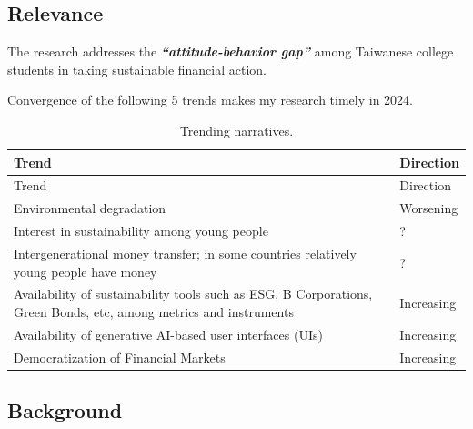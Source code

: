 \documentclass[
  letterpaper,
  DIV=11,
  numbers=noendperiod]{scrartcl}
\begin{document}
\subsection{Relevance}\label{relevance}

The research addresses the \textbf{\emph{``attitude-behavior gap''}}
among Taiwanese college students in taking sustainable financial action.

Convergence of the following 5 trends makes my research timely in 2024.

\begin{longtable}[]{@{}
  >{\raggedright\arraybackslash}p{}
  >{\raggedright\arraybackslash}p{}@{}}
\caption{Trending narratives.}\tabularnewline
\toprule\noalign{}
\begin{minipage}[b]{\linewidth}\raggedright
Trend
\end{minipage} & \begin{minipage}[b]{\linewidth}\raggedright
Direction
\end{minipage} \\
\midrule\noalign{}
\endfirsthead
\toprule\noalign{}
\begin{minipage}[b]{\linewidth}\raggedright
Trend
\end{minipage} & \begin{minipage}[b]{\linewidth}\raggedright
Direction
\end{minipage} \\
\midrule\noalign{}
\endhead
\bottomrule\noalign{}
\endlastfoot
Environmental degradation & Worsening \\
Interest in sustainability among young people & ? \\
Intergenerational money transfer; in some countries relatively young
people have money & ? \\
Availability of sustainability tools such as ESG, B Corporations, Green
Bonds, etc, among metrics and instruments & Increasing \\
Availability of generative AI-based user interfaces (UIs) &
Increasing \\
Democratization of Financial Markets & Increasing \\
\end{longtable}

\subsection{Background}\label{background}
\end{document}
